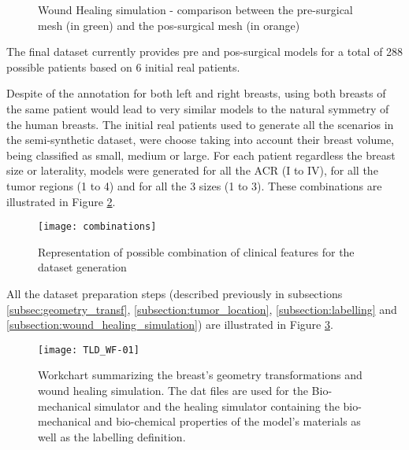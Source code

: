 \begin{figure}[H]
    \centering
    \qquad
    \qquad
    \caption[Wound Healing simulation]{Wound Healing simulation - comparison between the pre-surgical mesh (in green) and the pos-surgical mesh (in orange)}
    \label{fig:WHS}
\end{figure}



The final dataset currently provides pre and pos-surgical models for a total of 288 possible patients based on 6 initial real patients.

Despite of the annotation for both left and right breasts, using both breasts of the same patient would lead to very similar models to the natural symmetry of the human breasts. The initial real patients used to generate all the scenarios in the semi-synthetic dataset, were choose taking into account their breast volume, being classified as small, medium or large. For each patient regardless the breast size or laterality, models were generated for all the ACR (I to IV), for all the tumor regions (1 to 4) and for all the 3 sizes (1 to 3). These combinations are illustrated in Figure \ref{fig:combinations}.

\begin{figure}[!h]
\begin{center}
    \leavevmode
    \texttt{[image: combinations]}
    \caption[Clinical features combinations]{Representation of possible combination of clinical features for the dataset generation}
    \label{fig:combinations}
  \end{center}
\end{figure}

All the dataset preparation steps (described previously in subsections \ref{subsec:geometry_transf}, \ref{subsection:tumor_location}, \ref{subsection:labelling} and \ref{subsection:wound_healing_simulation}) are illustrated in Figure \ref{fig:tld}.

\begin{figure}[!h]
\begin{center}
    \leavevmode
    \texttt{[image: TLD\_WF-01]}
    \caption[Workchart summarizing the breast's geometry transformations and wound healing simulation]{Workchart summarizing the breast's geometry transformations and wound healing simulation. The dat files are used for the Bio-mechanical simulator and the healing simulator containing the bio-mechanical and bio-chemical properties of the model's materials as well as the labelling definition.}
    \label{fig:tld}
  \end{center}
\end{figure}

